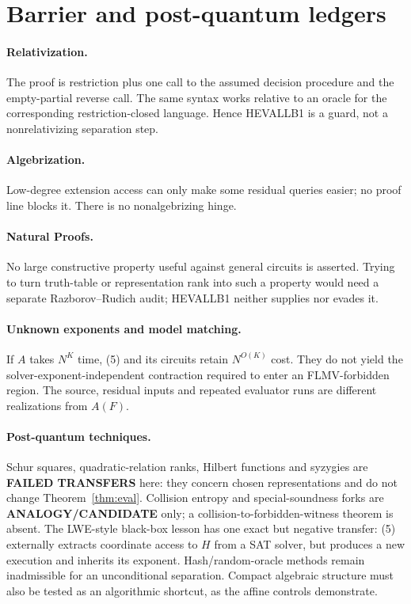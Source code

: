 \documentclass[11pt]{article}
\begin{document}
\section{Barrier and post-quantum ledgers}

\paragraph{Relativization.}
The proof is restriction plus one call to the assumed decision procedure and
the empty-partial reverse call.  The same syntax works relative to an oracle
for the corresponding restriction-closed language.  Hence HEVALLB1 is a guard,
not a nonrelativizing separation step.

\paragraph{Algebrization.}
Low-degree extension access can only make some residual queries easier; no
proof line blocks it.  There is no nonalgebrizing hinge.

\paragraph{Natural Proofs.}
No large constructive property useful against general circuits is asserted.
Trying to turn truth-table or representation rank into such a property would
need a separate Razborov--Rudich audit; HEVALLB1 neither supplies nor evades it.

\paragraph{Unknown exponents and model matching.}
If $A$ takes $N^K$ time, (5) and its circuits retain $N^{O(K)}$ cost.  They do
not yield the solver-exponent-independent contraction required to enter an
FLMV-forbidden region.  The source, residual inputs and repeated evaluator
runs are different realizations from $A(F)$.

\paragraph{Post-quantum techniques.}
Schur squares, quadratic-relation ranks, Hilbert functions and syzygies are
\textbf{FAILED TRANSFERS} here: they concern chosen representations and do
not change Theorem~\ref{thm:eval}.  Collision entropy and special-soundness
forks are \textbf{ANALOGY/CANDIDATE} only; a collision-to-forbidden-witness
theorem is absent.  The LWE-style black-box lesson has one exact but negative
transfer: (5) externally extracts coordinate access to $H$ from a SAT solver,
but produces a new execution and inherits its exponent.  Hash/random-oracle
methods remain inadmissible for an unconditional separation.  Compact
algebraic structure must also be tested as an algorithmic shortcut, as the
affine controls demonstrate.
\end{document}
